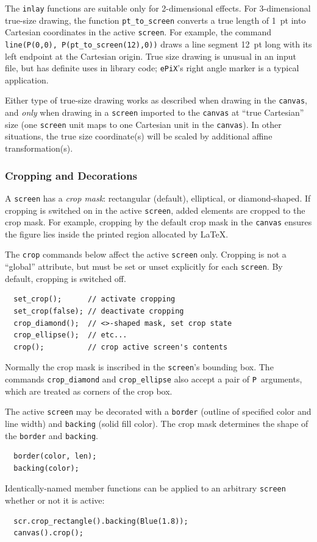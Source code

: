\documentclass[12pt,letterpaper]{book}
\newcommand{\code}[1]{\texttt{#1}}
\newcommand{\ePiX}{\code{ePiX}}
\newcommand{\findex}[1]{\ignorespaces}
\begin{document}
\findex{pt\_to\_screen}
The \code{inlay} functions are suitable only for 2-dimensional
effects. For 3-dimensional true-size drawing, the function
\code{pt\_to\_screen} converts a true length of 1~pt into Cartesian
coordinates in the active \code{screen}. For example, the command
\code{line(P(0,0), P(pt\_to\_screen(12),0))} draws a line segment
12~pt long with its left endpoint at the Cartesian origin. True size
drawing is unusual in an input file, but has definite uses in library
code; \ePiX's right angle marker is a typical application.

Either type of true-size drawing works as described when drawing in
the \code{canvas}, and \emph{only} when drawing in a \code{screen}
imported to the \code{canvas} at ``true Cartesian'' size (one
\code{screen} unit maps to one Cartesian unit in the \code{canvas}).
In other situations, the true size coordinate(s) will be scaled by
additional affine transformation(s).


\subsubsection*{Cropping and Decorations}

A \code{screen} has a \emph{crop mask}: rectangular (default),
elliptical, or diamond-shaped. If cropping is switched on in the
active \code{screen}, added elements are cropped to the crop mask.
For example, cropping by the default crop mask in the \code{canvas}
ensures the figure lies inside the printed region allocated by
\LaTeX.

The \code{crop} commands below affect the active \code{screen}
only. Cropping is not a ``global'' attribute, but must be set or unset
explicitly for each \code{screen}. By default, cropping is switched
off.
\findex{crop}
\findex{crop\_ellipse}
\findex{crop\_diamond}
\findex{set\_crop}
\begin{verbatim}
  set_crop();      // activate cropping
  set_crop(false); // deactivate cropping
  crop_diamond();  // <>-shaped mask, set crop state
  crop_ellipse();  // etc...
  crop();          // crop active screen's contents
\end{verbatim}
Normally the crop mask is inscribed in the \code{screen}'s bounding
box. The commands \code{crop\_diamond} and \code{crop\_ellipse} also
accept a pair of \code{P}~arguments, which are treated as corners of
the crop box. 

The active \code{screen} may be decorated with a \code{border}
(outline of specified color and line width) and \code{backing} (solid
fill color). The crop mask determines the shape of the \code{border}
and \code{backing}.
\findex{border}
\findex{backing}
\begin{verbatim}
  border(color, len);
  backing(color);
\end{verbatim}
Identically-named member functions can be applied to an arbitrary
\code{screen} whether or not it is active:
\begin{verbatim}
  scr.crop_rectangle().backing(Blue(1.8));
  canvas().crop();
\end{verbatim}
\end{document}
